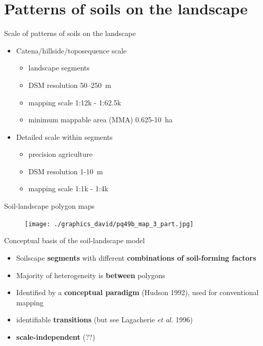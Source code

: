 \documentclass[aspectratio=169, 10pt]{beamer}
\begin{document}
\section{Patterns of soils on the landscape}

\begin{frame}{Scale of patterns of soils on the landscape}
\begin{itemize}
    \item Catena/hillside/toposequence scale
    \begin{itemize}
        \item landscape segments
        \item DSM resolution 50--250~m
        \item mapping scale 1:12k - 1:62.5k
        \item minimum mappable area (MMA) 0.625-10~ha
        \end{itemize}
    \item Detailed scale within segments
    \begin{itemize}
        \item precision agriculture
        \item DSM resolution 1-10~m
        \item mapping scale 1:1k - 1:4k
    \end{itemize}
\end{itemize}
\end{frame}

\begin{frame}{Soil-landscape polygon maps}
\begin{figure}
    \centering    \texttt{[image: ./graphics\_david/pq49b\_map\_3\_part.jpg]}
\end{figure}  
\end{frame}

\begin{frame}{Conceptual basis of the soil-landscape model}
    \begin{itemize}
        \item Soilscape \textbf{segments} with different \textbf{combinations of soil-forming factors}
        \item Majority of heterogeneity is \textbf{between} polygons
        \item Identified by a \textbf{conceptual paradigm} (Hudson 1992), used for conventional mapping
        \item identifiable \textbf{transitions} (but see Lagacherie \textit{et al.} 1996)
        \item \textbf{scale-independent} (??)
    \end{itemize}
\end{frame}
\end{document}
